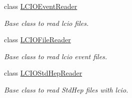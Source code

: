 \begin{DoxyCompactItemize}
class \hyperlink{class_d_d4hep_1_1_simulation_1_1_l_c_i_o_event_reader}{LCIOEventReader}
\begin{DoxyCompactList}\small\item\em Base class to read lcio files. \item\end{DoxyCompactList}\item 
class \hyperlink{class_d_d4hep_1_1_simulation_1_1_l_c_i_o_file_reader}{LCIOFileReader}
\begin{DoxyCompactList}\small\item\em Base class to read lcio event files. \item\end{DoxyCompactList}\item 
class \hyperlink{class_d_d4hep_1_1_simulation_1_1_l_c_i_o_std_hep_reader}{LCIOStdHepReader}
\begin{DoxyCompactList}\small\item\em Base class to read StdHep files with lcio. \item\end{DoxyCompactList}\end{DoxyCompactItemize}
